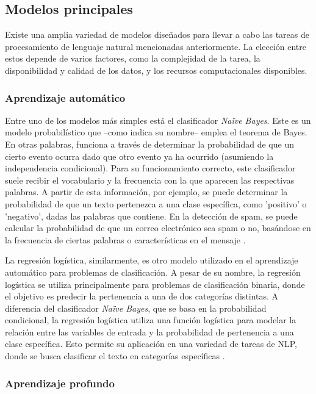 \subsection{Modelos principales}

Existe una amplia variedad de modelos diseñados para llevar a cabo las tareas de procesamiento de lenguaje natural mencionadas anteriormente. La elección entre estos depende de varios factores, como la complejidad de la tarea, la disponibilidad y calidad de los datos, y los recursos computacionales disponibles. 

\subsubsection{Aprendizaje automático}

Entre uno de los modelos más simples está el clasificador \textit{Naïve Bayes}. Este es un modelo probabilístico que –como indica su nombre– emplea el teorema de Bayes. En otras palabras, funciona a través de determinar la probabilidad de que un cierto evento ocurra dado que otro evento ya ha ocurrido (asumiendo la independencia condicional). Para su funcionamiento correcto, este clasificador suele recibir el vocabulario y la frecuencia con la que aparecen las respectivas palabras. A partir de esta información, por ejemplo, se puede determinar la probabilidad de que un texto pertenezca a una clase específica, como 'positivo' o 'negativo', dadas las palabras que contiene. En la detección de spam, se puede calcular la probabilidad de que un correo electrónico sea spam o no, basándose en la frecuencia de ciertas palabras o características en el mensaje \cite{eighteen}.

La regresión logística, similarmente, es otro modelo utilizado en el aprendizaje automático para problemas de clasificación. A pesar de su nombre, la regresión logística se utiliza principalmente para problemas de clasificación binaria, donde el objetivo es predecir la pertenencia a una de dos categorías distintas. A diferencia del clasificador \textit{Naïve Bayes}, que se basa en la probabilidad condicional, la regresión logística utiliza una función logística para modelar la relación entre las variables de entrada y la probabilidad de pertenencia a una clase específica. Esto permite su aplicación en una variedad de tareas de NLP, donde se busca clasificar el texto en categorías específicas \cite{nineteen}.

\subsubsection{Aprendizaje profundo}

